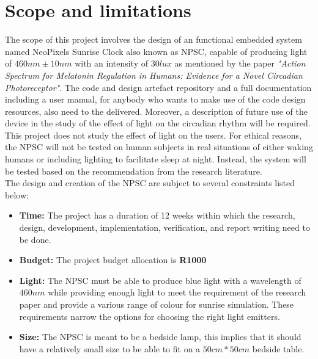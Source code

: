 \section{Scope and limitations}\label{scope_and_limitations}

The scope of this project involves the design of an functional embedded system named NeoPixels Sunrise Clock also known as NPSC, capable of producing light of $460nm \pm 10nm$ with an intensity of $30 lux$ as mentioned by the paper \textit{"Action Spectrum for Melatonin Regulation in Humans: Evidence for a Novel Circadian Photoreceptor"}. The code and design artefact repository and a full documentation including a user manual, for anybody who wants to make use of the code design resources, also need to the delivered. Moreover, a description of future use of the device in the study of the effect of light on the circadian rhythm will be required.\\
This project does not study the effect of light on the users. For ethical reasons, the NPSC will not be tested on human subjects in real situations of either waking humans or including lighting to facilitate sleep at night. Instead, the system will be tested based on the recommendation from the research literature.\\
The design and creation of the NPSC are subject to several constraints listed below:
\begin{itemize}
\item \textbf{Time:} The project has a duration of 12 weeks within which the research, design, development, implementation, verification, and report writing need to be done.
\item \textbf{Budget:} The project budget allocation is \textbf{R1000}
\item \textbf{Light:} The NPSC must be able to produce blue light with a wavelength of  $460nm$ while providing enough light to meet the requirement of the research paper and provide a various range of colour for sunrise simulation. These requirements narrow the options for choosing the right light emitters.
\item \textbf{Size:} The NPSC is meant to be a bedside lamp, this implies that it should have a relatively small size to be able to fit on a $50cm*50cm$ bedside table.
\end{itemize}


